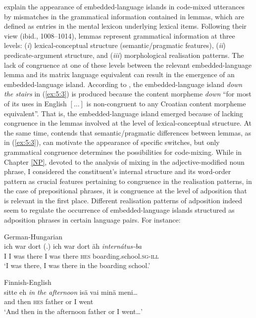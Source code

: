\noindent \cite{myers-scotton-matching-1995} explain the appearance of embedded-language islands in code-mixed utterances by mismatches in the grammatical information contained in lemmas, which are defined as entries in the mental lexicon underlying lexical items. Following their view (ibid., 1008--1014), lemmas represent grammatical information at three levels: (\textit{i}) lexical-conceptual structure (semantic/pragmatic features), (\textit{ii}) predicate-argument structure, and (\textit{iii}) morphological realisation patterns. The lack of congruence at one of these levels between the relevant embedded-language lemma and its matrix language equivalent can result in the emergence of an embedded-language island. According to \cite[][227]{hlavac-second-generation-2003}, the embedded-language island \textit{down the stairs} in (\ref{ex:5:3}) is produced because the content morpheme \textit{down} ``for most of its uses in English \([\dots{}]\) is non-congruent to any Croatian content morpheme equivalent''. That is, the embedded-language island emerged because of lacking congruence in the lemmas involved at the level of lexical-conceptual structure. At the same time, \cite[258]{deuchar-congruence-2005} contends that semantic/pragmatic differences between lemmas, as in (\ref{ex:5:3}), can motivate the appearance of specific switches, but only grammatical congruence determines the possibilities for code-mixing. While in Chapter \ref{NP}, devoted to the analysis of mixing in the adjective-modified noun phrase, I considered the constituent's internal structure and its word-order pattern as crucial features pertaining to congruence in the realisation patterns, in the case of prepositional phrases, it is congruence at the level of adposition that is relevant in the first place. Different realisation patterns of adposition indeed seem to regulate the occurrence of embedded-language islands structured as adposition phrases in certain language pairs. For instance:

\ea
\label{ex:5:4}
German-Hungarian \citep[435]{szabo-language-2010}\\
 {ich} {war} {dort (.)} {ich} {war} {dort} {äh} \textit{internátus-ba}\\
	{I} I was there I was there \textsc{hes} boarding.school.\textsc{sg-ill}\\
\glt `I was there, I was there in the boarding school.'
\z

\ea
\label{ex:5:5}
Finnish-English \citep[226]{lehtinen-analysis-1966}\\
 {sitte} {eh} \textit{in the afternoon} {isä} {vai} {minä} {meni\dots{}}\\
	{and} then \textsc{hes} {} father or I went\\
\glt `And then in the afternoon father or I went\dots{}'
\z

